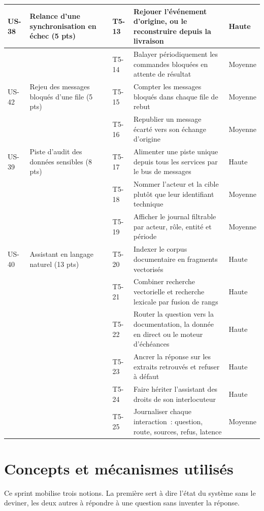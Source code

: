 \begin{small}
\begin{longtable}{L{1.1cm}L{3.0cm}L{1.2cm}L{7.0cm}L{1.4cm}}
\hline
US-38 & Relance d'une synchronisation en échec (5 pts) & T5-13 & Rejouer l'événement d'origine, ou le reconstruire depuis la livraison & Haute \\
\hline
      &  & T5-14 & Balayer périodiquement les commandes bloquées en attente de résultat & Moyenne \\
\hline
US-42 & Rejeu des messages bloqués d'une file (5 pts) & T5-15 & Compter les messages bloqués dans chaque file de rebut & Moyenne \\
\hline
      &  & T5-16 & Republier un message écarté vers son échange d'origine & Moyenne \\
\hline
US-39 & Piste d'audit des données sensibles (8 pts) & T5-17 & Alimenter une piste unique depuis tous les services par le bus de messages & Haute \\
\hline
      &  & T5-18 & Nommer l'acteur et la cible plutôt que leur identifiant technique & Moyenne \\
\hline
      &  & T5-19 & Afficher le journal filtrable par acteur, rôle, entité et période & Moyenne \\
\hline
US-40 & Assistant en langage naturel (13 pts) & T5-20 & Indexer le corpus documentaire en fragments vectorisés & Haute \\
\hline
      &  & T5-21 & Combiner recherche vectorielle et recherche lexicale par fusion de rangs & Haute \\
\hline
      &  & T5-22 & Router la question vers la documentation, la donnée en direct ou le moteur d'échéances & Haute \\
\hline
      &  & T5-23 & Ancrer la réponse sur les extraits retrouvés et refuser à défaut & Haute \\
\hline
      &  & T5-24 & Faire hériter l'assistant des droits de son interlocuteur & Haute \\
\hline
      &  & T5-25 & Journaliser chaque interaction~: question, route, sources, refus, latence & Moyenne \\
\hline
\end{longtable}
\end{small}

\section{Concepts et mécanismes utilisés}

Ce sprint mobilise trois notions. La première sert à dire l'état du système sans le deviner, les deux
autres à répondre à une question sans inventer la réponse.

